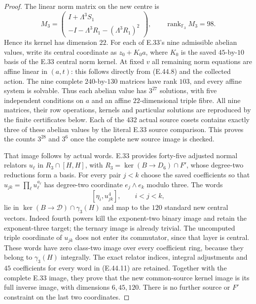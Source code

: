 \begin{proof}
The linear norm matrix on the new centre is
\[
 M_3=\begin{pmatrix}
 I+\Lambda^3S_1\\
 -I-\Lambda^3R_1-(\Lambda^3R_1)^2
 \end{pmatrix},\qquad
           \operatorname{rank}_{\mathbb F_3}M_3=98.
 \tag{E.44.10}
\]
Hence its kernel has dimension $22$.
For each of E.33's nine admissible abelian values,
write its central coordinate as $z_0+K_0 a$, where
$K_0$ is the saved $45$-by-$10$ basis of the
E.33 central norm kernel.
At fixed $v$ all remaining norm equations are
affine linear in $(a,t)$: this follows directly
from \textup{(E.44.8)} and the collected action.
The nine complete $240$-by-$130$ matrices have
rank $103$, and every affine system is solvable.
Thus each abelian value has $3^{27}$ solutions,
with five independent conditions on $a$ and an
affine $22$-dimensional triple fibre.
All nine matrices, their row operations, kernels
and particular solutions are reproduced by the
finite certificates below.  Each of the $432$
actual source cosets contains exactly three of
these abelian values by the literal E.33 source
comparison.  This proves the counts $3^{28}$ and
$3^6$ once the complete new source image is checked.

That image follows by actual words.  E.33 provides
forty-five adjusted normal relators $u_\ell$ in
$R_3\cap[H,H]$, with $R_3=\ker(B\to D_6)\cap F'$,
whose degree-two reductions form a basis.
For every pair $j<k$ choose the saved coefficients
so that $u_{jk}=\prod_\ell u_\ell^{a_\ell}$ has
degree-two coordinate $e_j\wedge e_k$ modulo three.
The words
\[
                 [\eta_i,u_{jk}^{4}],\qquad i<j<k,
 \tag{E.44.11}
\]
lie in $\ker(B\to\mathscr D)\cap\gamma_3(H)$
and map to the $120$ standard new central vectors.
Indeed fourth powers kill the exponent-two binary
image and retain the exponent-three target;
the ternary image is already trivial.
The uncomputed triple coordinate of $u_{jk}$
does not enter its commutator, since that layer
is central.  These words have zero class-two
image over every coefficient ring, because they
belong to $\gamma_3(H)$ integrally.
The exact relator indices, integral adjustments
and $45$ coefficients for every word in
\textup{(E.44.11)} are retained.
Together with the complete E.33 image, they prove
that the new common-source kernel image is its
full inverse image, with dimensions $6,45,120$.
There is no further source or $F'$ constraint
on the last two coordinates.


\end{proof}
